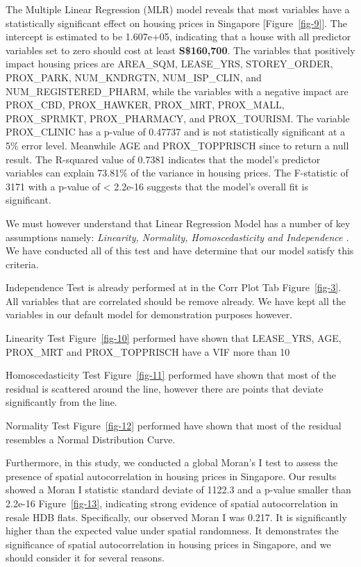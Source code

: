 \documentclass[manuscript,screen]{acmart}
\begin{document}
The Multiple Linear Regression (MLR) model reveals that most variables
have a statistically significant effect on housing prices in Singapore
{[}Figure~\ref{fig-9}{]}. The intercept is estimated to be 1.607e+05,
indicating that a house with all predictor variables set to zero should
cost at least \textbf{S\$160,700}. The variables that positively impact
housing prices are AREA\_SQM, LEASE\_YRS, STOREY\_ORDER, PROX\_PARK,
NUM\_KNDRGTN, NUM\_ISP\_CLIN, and NUM\_REGISTERED\_PHARM, while the
variables with a negative impact are PROX\_CBD, PROX\_HAWKER, PROX\_MRT,
PROX\_MALL, PROX\_SPRMKT, PROX\_PHARMACY, and PROX\_TOURISM. The
variable PROX\_CLINIC has a p-value of 0.47737 and is not statistically
significant at a 5\% error level. Meanwhile AGE and PROX\_TOPPRISCH
since to return a null result. The R-squared value of 0.7381 indicates
that the model's predictor variables can explain 73.81\% of the variance
in housing prices. The F-statistic of 3171 with a p-value of \textless{}
2.2e-16 suggests that the model's overall fit is significant.

We must however understand that Linear Regression Model has a number of
key assumptions namely: \emph{Linearity, Normality, Homoscedasticity and
Independence} \citep{ernst2017}\emph{.} We have conducted all of this
test and have determine that our model satisfy this criteria.

Independence Test is already performed at in the Corr Plot Tab
Figure~\ref{fig-3}. All variables that are correlated should be remove
already. We have kept all the variables in our default model for
demonstration purposes however.

Linearity Test Figure~\ref{fig-10} performed have shown that LEASE\_YRS,
AGE, PROX\_MRT and PROX\_TOPPRISCH have a VIF more than 10

Homoscedasticity Test Figure~\ref{fig-11} performed have shown that most
of the residual is scattered around the line, however there are points
that deviate significantly from the line.

Normality Test Figure~\ref{fig-12} performed have shown that most of the
residual resembles a Normal Distribution Curve.

Furthermore, in this study, we conducted a global Moran's I test to
assess the presence of spatial autocorrelation in housing prices in
Singapore. Our results showed a Moran I statistic standard deviate of
1122.3 and a p-value smaller than 2.2e-16 Figure~\ref{fig-13},
indicating strong evidence of spatial autocorrelation in resale HDB
flats. Specifically, our observed Moran I was 0.217. It is significantly
higher than the expected value under spatial randomness. It demonstrates
the significance of spatial autocorrelation in housing prices in
Singapore, and we should consider it for several reasons.
\end{document}
